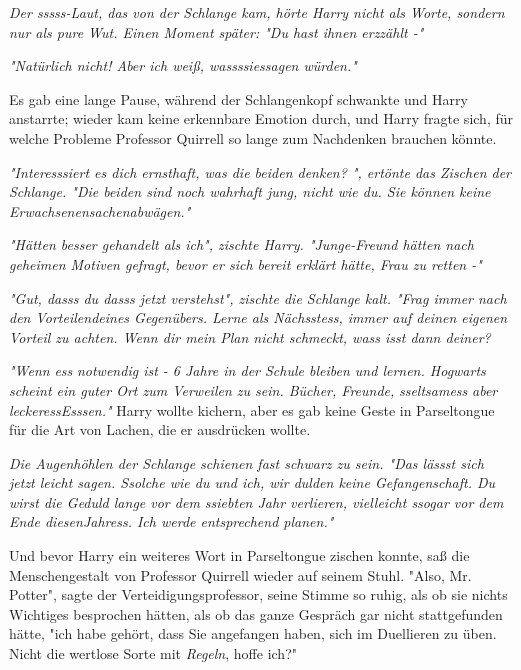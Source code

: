 {\emph{Der sssss-Laut, das von der Schlange kam, hörte Harry nicht als Worte, sondern nur als pure Wut. Einen Moment später: \emph{"Du hast ihnen} \emph{erzzählt} \emph{-"}}

\emph{\emph{"Natürlich nicht! Aber ich weiß,} \emph{wassssiessagen} \emph{würden."}}

Es gab eine lange Pause, während der Schlangenkopf schwankte und Harry anstarrte; wieder kam keine erkennbare Emotion durch, und Harry fragte sich, für welche Probleme Professor Quirrell so lange zum Nachdenken brauchen könnte.

\emph{\emph{"Interesssiert} \emph{es dich ernsthaft, was die beiden denken? "}, ertönte das Zischen der Schlange. \emph{"Die beiden} \emph{sind} \emph{noch wahrhaft jung, nicht wie} \emph{du. Sie können keine} \emph{Erwachsenensachenabwägen."}}

\emph{\emph{"Hätten besser gehandelt} \emph{als ich"}, zischte Harry. \emph{"Junge-Freund hätten nach geheimen Motiven gefragt, bevor er sich bereit erklärt hätte, Frau zu retten -"}}

\emph{\emph{"Gut,} \emph{dasss} \emph{du} \emph{dasss} \emph{jetzt verstehst}", zischte die Schlange kalt. \emph{"Frag immer nach den Vorteilendeines Gegenübers. Lerne als} \emph{Nächsstess, immer auf} \emph{deinen} \emph{eigenen Vorteil zu achten. Wenn} \emph{dir} \emph{mein Plan} \emph{nicht schmeckt,} \emph{wass} \emph{isst dann deiner?}}

\emph{"Wenn} \emph{ess} \emph{notwendig ist - 6 Jahre in der Schule bleiben und lernen. Hogwarts scheint ein guter Ort zum Verweilen zu sein. Bücher, Freunde,} \emph{sseltsamess} \emph{aber} \emph{leckeressEsssen."} Harry wollte kichern, aber es gab keine Geste in Parseltongue für die Art von Lachen, die er ausdrücken wollte.

\emph{Die Augenhöhlen der Schlange schienen fast schwarz zu sein. \emph{"Das} \emph{lässst} \emph{sich} \emph{jetzt} \emph{leicht sagen.} \emph{Ssolche} \emph{wie du und ich, wir dulden keine Gefangenschaft. Du wirst die Geduld lange vor dem} \emph{ssiebten} \emph{Jahr verlieren, vielleicht} \emph{ssogar} \emph{vor dem Ende diesenJahress. Ich werde entsprechend planen."}}

Und bevor Harry ein weiteres Wort in Parseltongue zischen konnte, saß die Menschengestalt von Professor Quirrell wieder auf seinem Stuhl. "Also, Mr. Potter", sagte der Verteidigungsprofessor, seine Stimme so ruhig, als ob sie nichts Wichtiges besprochen hätten, als ob das ganze Gespräch gar nicht stattgefunden hätte, "ich habe gehört, dass Sie angefangen haben, sich im Duellieren zu üben. Nicht die wertlose Sorte mit \emph{Regeln}, hoffe ich?"

}
